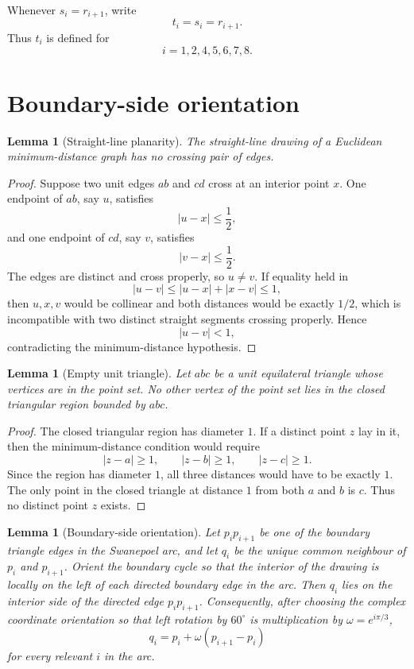 \documentclass[11pt]{article}
\newtheorem{lemma}[theorem]{Lemma}
\begin{document}
Whenever $s_i=r_{i+1}$, write
\[
 t_i=s_i=r_{i+1}.
\]
Thus $t_i$ is defined for
\[
 i=1,2,4,5,6,7,8.
\]


\section{Boundary-side orientation}

\begin{lemma}[Straight-line planarity]\label{lem:straight-planar}
The straight-line drawing of a Euclidean minimum-distance graph has no crossing pair of edges.
\end{lemma}

\begin{proof}
Suppose two unit edges $ab$ and $cd$ cross at an interior point $x$. One endpoint of $ab$, say $u$, satisfies
\[
 |u-x|\le \frac12,
\]
and one endpoint of $cd$, say $v$, satisfies
\[
 |v-x|\le \frac12.
\]
The edges are distinct and cross properly, so $u\ne v$. If equality held in
\[
 |u-v|\le |u-x|+|x-v|\le1,
\]
then $u,x,v$ would be collinear and both distances would be exactly $1/2$, which is incompatible with two distinct straight segments crossing properly. Hence
\[
 |u-v|<1,
\]
contradicting the minimum-distance hypothesis.
\end{proof}

\begin{lemma}[Empty unit triangle]\label{lem:empty-triangle}
Let $abc$ be a unit equilateral triangle whose vertices are in the point set. No other vertex of the point set lies in the closed triangular region bounded by $abc$.
\end{lemma}

\begin{proof}
The closed triangular region has diameter $1$. If a distinct point $z$ lay in it, then the minimum-distance condition would require
\[
 |z-a|\ge1,
 \qquad |z-b|\ge1,
 \qquad |z-c|\ge1.
\]
Since the region has diameter $1$, all three distances would have to be exactly $1$. The only point in the closed triangle at distance $1$ from both $a$ and $b$ is $c$. Thus no distinct point $z$ exists.
\end{proof}

\begin{lemma}[Boundary-side orientation]\label{lem:boundary-side}
Let $p_ip_{i+1}$ be one of the boundary triangle edges in the Swanepoel arc, and let $q_i$ be the unique common neighbour of $p_i$ and $p_{i+1}$. Orient the boundary cycle so that the interior of the drawing is locally on the left of each directed boundary edge in the arc. Then $q_i$ lies on the interior side of the directed edge $p_ip_{i+1}$. Consequently, after choosing the complex coordinate orientation so that left rotation by $60^\circ$ is multiplication by $\omega=e^{i\pi/3}$,
\[
 q_i=p_i+\omega(p_{i+1}-p_i)
\]
for every relevant $i$ in the arc.
\end{lemma}
\end{document}
